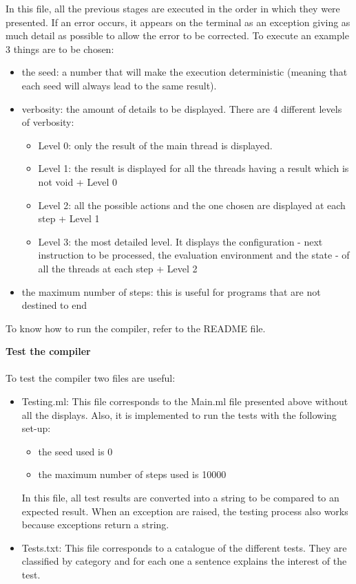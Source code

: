 \documentclass[11pt]{report}
\begin{document}
In this file, all the previous stages are executed in the order in which they were presented. If an error occurs, it appears on the terminal as an exception giving as much detail as possible to allow the error to be corrected. 
To execute an example 3 things are to be chosen:
\begin{itemize}
\item the seed: a number that will make the execution deterministic (meaning that each seed will always lead to the same result).
\item verbosity: the amount of details to be displayed. There are 4 different levels of verbosity:
    \begin{itemize}
        \item Level 0: only the result of the main thread is displayed. 
        \item Level 1: the result is displayed for all the threads having a result which is not void + Level 0 
        \item Level 2: all the possible actions and the one chosen are displayed at each step + Level 1
        \item Level 3: the most detailed level. It displays the configuration - next instruction to be processed, the evaluation environment and the state - of all the threads at each step + Level 2
        \end{itemize}
\item the maximum number of steps: this is useful for programs that are not destined to end
\end{itemize}

To know how to run the compiler, refer to the README file.

{}
\tabto{0cm} {\LARGE \textbf{Test the compiler}}
\\ \\
To test the compiler two files are useful:
\begin{itemize}
\item Testing.ml: This file corresponds to the Main.ml file presented above without all the displays. Also, it is implemented to run the tests with the following set-up:
\begin{itemize}
    \item the seed used is 0
    \item the maximum number of steps used is 10000
\end{itemize}
In this file, all test results are converted into a string to be compared to an expected result. When an exception are raised, the testing process also works because exceptions return a string.
\item Tests.txt: This file corresponds to a catalogue of the different tests. They are classified by category and for each one a sentence explains the interest of the test.
\end{itemize}
\end{document}

